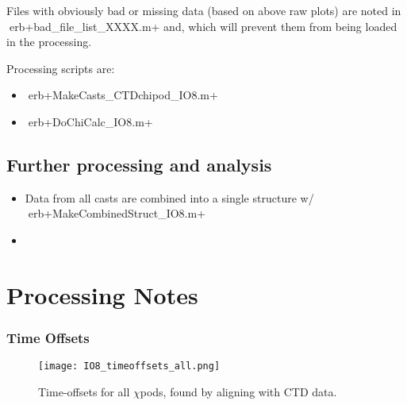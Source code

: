 \documentclass[11pt]{article}
\begin{document}
Files with obviously bad or missing data (based on above raw plots) are noted in erb+bad_file_list_XXXX.m+ and, which will prevent them from being loaded in the processing. 

Processing scripts are: 
\begin{itemize} 
\item erb+MakeCasts_CTDchipod_IO8.m+ 
\item erb+DoChiCalc_IO8.m+ 
\end{itemize} 

\subsection{Further processing and analysis} 

\begin{itemize} 
\item Data from all casts are combined into a single structure w/ erb+MakeCombinedStruct_IO8.m+ 
\item  
\end{itemize} 

\newpage 

 \section{Processing Notes} 





\subsubsection{Time Offsets} 

\begin{figure}[htbp] 

\texttt{[image: IO8\_timeoffsets\_all.png]} 
\caption{Time-offsets for all $\chi$pods, found by aligning with CTD data.} 
\label{toffs} 
\end{figure} 

\newpage 
\end{document}
